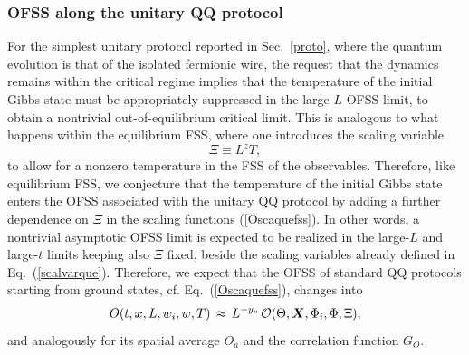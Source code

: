 \subsubsection{OFSS along the unitary QQ protocol}
\label{scalprota}



For the simplest unitary protocol reported in Sec.~\ref{proto}, where
the quantum evolution is that of the isolated fermionic wire, the
request that the dynamics remains within the critical regime implies
that the temperature of the initial Gibbs state must be appropriately
suppressed in the large-$L$ OFSS limit, to obtain a nontrivial
out-of-equilibrium critical limit.  This is analogous to what happens
within the equilibrium FSS, where one introduces the scaling
variable~\cite{SGCS-97,Sachdev-book,RV-21}
\begin{equation}
  \Xi \equiv L^z T,
 \label{Xidef}
\end{equation}
to allow for a nonzero temperature in the FSS of the observables.
Therefore, like equilibrium FSS, we conjecture that the temperature of
the initial Gibbs state enters the OFSS associated with the unitary QQ
protocol by adding a further dependence on $\Xi$ in the scaling
functions (\ref{Oscaquefss}).  In other words, a nontrivial asymptotic
OFSS limit is expected to be realized in the large-$L$ and large-$t$
limits keeping also $\Xi$ fixed, beside the scaling variables already
defined in Eq.~(\ref{scalvarque}).  Therefore, we expect that the OFSS
of standard QQ protocols starting from ground states,
cf. Eq.~(\ref{Oscaquefss}), changes into
\begin{eqnarray}
   O(t, {\bm x}, L, w_i, w, T) \, \approx \, L^{-y_o} \, {\cal
    O}(\Theta, {\bm X}, \Phi_i, \Phi, \Xi),
    \label{Oscaquefssa}
\end{eqnarray}
and analogously for its spatial average $O_a$ and the correlation
function $G_O$.

